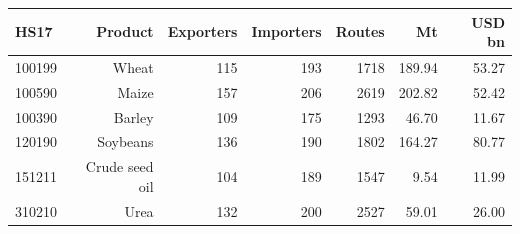 \begin{tabular}{lrrrrrr}
\toprule
HS17 & Product & Exporters & Importers & Routes & Mt & USD bn \\
\midrule
100199 & Wheat & 115 & 193 & 1718 & 189.94 & 53.27 \\
100590 & Maize & 157 & 206 & 2619 & 202.82 & 52.42 \\
100390 & Barley & 109 & 175 & 1293 & 46.70 & 11.67 \\
120190 & Soybeans & 136 & 190 & 1802 & 164.27 & 80.77 \\
151211 & Crude seed oil & 104 & 189 & 1547 & 9.54 & 11.99 \\
310210 & Urea & 132 & 200 & 2527 & 59.01 & 26.00 \\
\bottomrule
\end{tabular}
